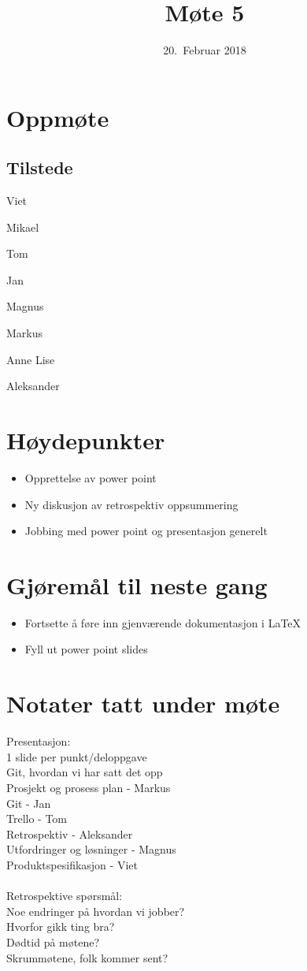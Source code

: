 \documentclass[letterpaper,11pt]{article}
\title{Møte 5}
\date{20.~Februar 2018}
\begin{document}
\maketitle
\section*{Oppmøte}
\subsection*{Tilstede}
\begin{list}{}{}
	\item Viet
	\item Mikael
	\item Tom
	\item Jan
	\item Magnus
	\item Markus
	\item Anne Lise
	\item Aleksander
\end{list}

\newpage
\section*{Høydepunkter}
\begin{itemize}
	\item Opprettelse av power point
	\item Ny diskusjon av retrospektiv oppsummering
	\item Jobbing med power point og presentasjon generelt
\end{itemize}

\section*{Gjøremål til neste gang}
\begin{itemize}
	\item Fortsette å føre inn gjenværende dokumentasjon i LaTeX
	\item Fyll ut power point slides
\end{itemize}

\section*{Notater tatt under møte}
Presentasjon:\\
1 slide per punkt/deloppgave\\
Git, hvordan vi har satt det opp\\
Prosjekt og prosess plan - Markus\\
Git - Jan\\
Trello - Tom\\
Retrospektiv - Aleksander\\
Utfordringer og løsninger - Magnus\\
Produktspesifikasjon - Viet\\\\
Retrospektive spørsmål:\\
Noe endringer på hvordan vi jobber?\\
Hvorfor gikk ting bra?\\
Dødtid på møtene?\\
Skrummøtene, folk kommer sent?
\end{document}
